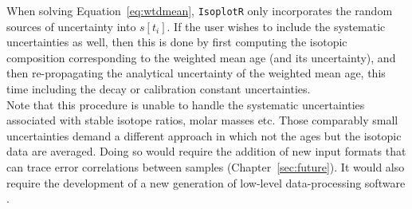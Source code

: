\begin{refsection}
When solving Equation~\ref{eq:wtdmean}, \texttt{IsoplotR} only
incorporates the random sources of uncertainty into $s[t_i]$.  If the
user wishes to include the systematic uncertainties as well, then this
is done by first computing the isotopic composition corresponding to
the weighted mean age (and its uncertainty), and then re-propagating
the analytical uncertainty of the weighted mean age, this time
including the decay or calibration constant uncertainties.\\

Note that this procedure is unable to handle the systematic
uncertainties associated with stable isotope ratios, molar masses
etc. Those comparably small uncertainties demand a different approach
in which not the ages but the isotopic data are averaged.  Doing so
would require the addition of new input formats that can trace error
correlations between samples (Chapter~\ref{sec:future}). It would also
require the development of a new generation of low-level
data-processing software \citep{vermeesch2015b,mclean2016}.


\end{refsection}
